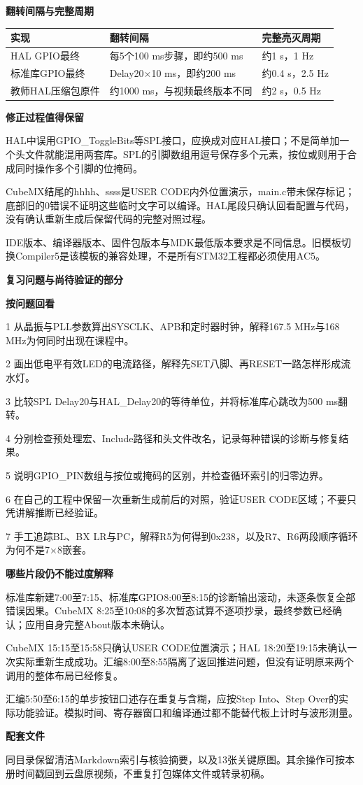 \documentclass[10pt,a4paper]{article}
\newcommand{\qtitle}[1]{{\Large\bfseries #1}\par\vspace{4pt}}
\newcommand{\qsub}[1]{{\bfseries #1}\par}
\begin{document}
\qsub{翻转间隔与完整周期}
\begingroup\small
\begin{tabularx}{\linewidth}{|>{\hsize}Y|>{\hsize}Y|>{\hsize}Y|}\hline
{}
\textbf{实现} & \textbf{翻转间隔} & \textbf{完整亮灭周期} \\ \hline
HAL GPIO最终 & 每5个100 ms步骤，即约500 ms & 约1 s，1 Hz \\ \hline
标准库GPIO最终 & Delay20×10 ms，即约200 ms & 约0.4 s，2.5 Hz \\ \hline
教师HAL压缩包原件 & 约1000 ms，与视频最终版本不同 & 约2 s，0.5 Hz \\ \hline
\end{tabularx}
\endgroup\par
\qsub{修正过程值得保留}
HAL中误用GPIO\_\allowbreak{}ToggleBits等SPL接口，应换成对应HAL接口；不是简单加一个头文件就能混用两套库。SPL的引脚数组用逗号保存多个元素，按位或则用于合成同时操作多个引脚的位掩码。

CubeMX结尾的hhhh、ssss是USER CODE内外位置演示，main.c带未保存标记；底部旧的0错误不证明这些临时文字可以编译。HAL尾段只确认回看配置与代码，没有确认重新生成后保留代码的完整对照过程。

IDE版本、编译器版本、固件包版本与MDK最低版本要求是不同信息。旧模板切换Compiler5是该模板的兼容处理，不是所有STM32工程都必须使用AC5。


\clearpage
{}
\qtitle{复习问题与尚待验证的部分}
\qsub{按问题回看}
1  从晶振与PLL参数算出SYSCLK、APB和定时器时钟，解释167.5 MHz与168 MHz为何同时出现在课程中。

2  画出低电平有效LED的电流路径，解释先SET八脚、再RESET一路怎样形成流水灯。

3  比较SPL Delay20与HAL\_\allowbreak{}Delay20的等待单位，并将标准库心跳改为500 ms翻转。

4  分别检查预处理宏、Include路径和头文件改名，记录每种错误的诊断与修复结果。

5  说明GPIO\_\allowbreak{}PIN数组与按位或掩码的区别，并检查循环索引的归零边界。

6  在自己的工程中保留一次重新生成前后的对照，验证USER CODE区域；不要只凭讲解推断已经验证。

7  手工追踪BL、BX LR与PC，解释R5为何得到0x238，以及R7、R6两段顺序循环为何不是7×8嵌套。

\qsub{哪些片段仍不能过度解释}
标准库新建7:00至7:15、标准库GPIO8:00至8:15的诊断输出滚动，未逐条恢复全部错误因果。CubeMX 8:25至10:08的多次暂态试算不逐项抄录，最终参数已经确认；应用自身完整About版本未确认。

CubeMX 15:15至15:58只确认USER CODE位置演示；HAL 18:20至19:15未确认一次实际重新生成成功。汇编8:00至8:55隔离了返回推进问题，但没有证明原来两个调用的整体布局已经修复。

汇编5:50至6:15的单步按钮口述存在重复与含糊，应按Step Into、Step Over的实际功能验证。模拟时间、寄存器窗口和编译通过都不能替代板上计时与波形测量。

\qsub{配套文件}
同目录保留清洁Markdown索引与核验摘要，以及13张关键原图。其余操作可按本册时间戳回到云盘原视频，不重复打包媒体文件或转录初稿。
\end{document}
